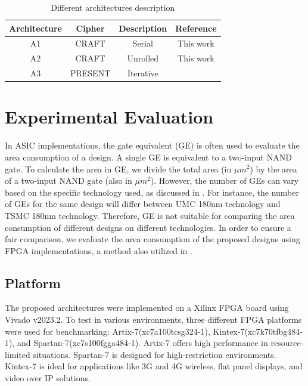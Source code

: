 \documentclass[final,5p,times,twocolumn]{elsarticle}
\begin{document}
\begin{table}[h]
    \centering
    \caption{Different architectures description}\label{tab2}%
    \begin{tabular}{|c|c|c|c|}
        \hline
        Architecture & Cipher  & Description & Reference           \\
        \hline
        A1           & CRAFT   & Serial      & This work           \\
        A2           & CRAFT   & Unrolled    & This work           \\
        A3           & PRESENT & Iterative   & \cite{Bharathi2022} \\
        \hline
    \end{tabular}
\end{table}


\section{Experimental Evaluation}\label{sec4}

In ASIC implementations, the gate equivalent (GE) is often used to evaluate the area consumption of a design.
A single GE is equivalent to a two-input NAND gate.
To calculate the area in GE, we divide the total area (in $\mu m^2$) by the area of a two-input NAND gate (also in $\mu m^2$).
However, the number of GEs can vary based on the specific technology used, as discussed in \cite{Turan}.
For instance, the number of GEs for the same design will differ between UMC 180nm technology and TSMC 180nm technology.
Therefore, GE is not suitable for comparing the area consumption of different designs on different technologies.
In order to ensure a fair comparison, we evaluate the area consumption of the proposed designs using FPGA implementations, a method also utilized in \cite{Mohajerani2020}.

\subsection{Platform}\label{subsec4}

The proposed architectures were implemented on a Xilinx FPGA board using Vivado v2023.2. To test in various environments, three different FPGA platforms were used for benchmarking: Artix-7(xc7a100tcsg324-1), Kintex-7(xc7k70tfbg484-1), and Spartan-7(xc7s100fgga484-1).
Artix-7 offers high performance in resource-limited situations. Spartan-7 is designed for high-restriction environments. Kintex-7 is ideal for applications like 3G and 4G wireless, flat panel displays, and video over IP solutions.
\end{document}
